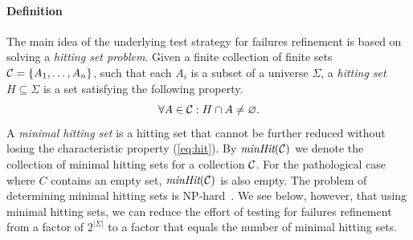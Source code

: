 \paragraph{Definition} The main idea of the underlying test strategy for failures
refinement is based on solving a \emph{hitting set problem}. Given a finite
collection of finite sets ${\cal C} = \{ A_1,\dots,A_n\}$, such that each
$A_i$ is a subset of a universe $\Sigma$, a \emph{hitting set}
$H\subseteq\Sigma$ is a set satisfying the following property.
%
\begin{equation}
  \label{eq:hit}
  \forall A\in {\cal C}: H\cap A \neq\varnothing.
\end{equation}
%
A \emph{minimal hitting set} is a hitting set that cannot be further reduced
without losing the characteristic property (\ref{eq:hit}). By $\text{\it minHit}({\cal
C})$ we denote the collection of minimal hitting sets for a collection ${\cal
C}$. For the pathological case where $C$ contains an empty set,
$\text{\it minHit}({\cal C})$ is also empty. The problem of determining minimal hitting sets is %
NP-hard~\cite{5533149}. We see below, however, that using minimal hitting
sets, we can reduce the effort of testing for failures refinement from a
factor of $2^{|\Sigma|}$ to a factor that equals the number of minimal
hitting sets.


